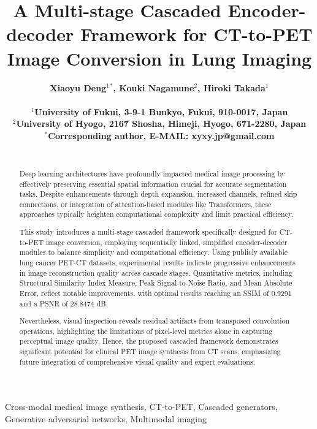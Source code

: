 \documentclass[a4paper, times, 10pt,twocolumn]{article}
\begin{document}
\title{A Multi-stage Cascaded Encoder-decoder Framework for CT-to-PET Image Conversion in Lung Imaging}  %

\author{\bf{\normalsize{Xiaoyu Deng${^1}{^*}$, Kouki Nagamune${^2}$, Hiroki Takada${^1}$}}\\ %
	\\
	\normalsize{$^1$University of Fukui, 3-9-1 Bunkyo, Fukui, 910-0017, Japan}\\
	\normalsize{$^2$University of Hyogo, 2167 Shosha, Himeji, Hyogo, 671-2280, Japan} \\
	\normalsize{$^*$Corresponding author, E-MAIL: xyxy.jp@gmail.com}\\
	\\}


\maketitle \thispagestyle{empty}

\begin{abstract}
	{
		Deep learning architectures have profoundly impacted medical image processing by effectively preserving essential spatial information crucial for accurate segmentation tasks. Despite enhancements through depth expansion, increased channels, refined skip connections, or integration of attention-based modules like Transformers, these approaches typically heighten computational complexity and limit practical efficiency.

		This study introduces a multi-stage cascaded framework specifically designed for CT-to-PET image conversion, employing sequentially linked, simplified encoder-decoder modules to balance simplicity and computational efficiency. Using publicly available lung cancer PET-CT datasets, experimental results indicate progressive enhancements in image reconstruction quality across cascade stages. Quantitative metrics, including Structural Similarity Index Measure, Peak Signal-to-Noise Ratio, and Mean Absolute Error, reflect notable improvements, with optimal results reaching an SSIM of 0.9291 and a PSNR of 28.8474 dB.

		Nevertheless, visual inspection reveals residual artifacts from transposed convolution operations, highlighting the limitations of pixel-level metrics alone in capturing perceptual image quality. Hence, the proposed cascaded framework demonstrates significant potential for clinical PET image synthesis from CT scans, emphasizing future integration of comprehensive visual quality and expert evaluations.
	}
\end{abstract}
\begin{keywords}
	{Cross-modal medical image synthesis, CT-to-PET, Cascaded generators, Generative adversarial networks, Multimodal imaging}
\end{keywords}
\end{document}
